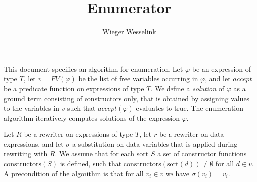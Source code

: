 \documentclass{article}
\begin{document}
\title{Enumerator}
\author{Wieger Wesselink}
\maketitle

This document specifies an algorithm for enumeration. Let $\varphi $ be an
expression of type $T$, let $v=FV(\varphi )$ be the list of free variables
occurring in $\varphi $, and let $accept$ be a predicate function on
expressions of type $T$. We define a \emph{solution} of $\varphi $ as a
ground term consisting of constructors only, that is obtained by assigning
values to the variables in $v$ such that $accept(\varphi)$ evaluates to true. The
enumeration algorithm iteratively computes solutions of the expression $%
\varphi$.

Let $R$ be a rewriter on expressions of type $T$, let $r$ be a rewriter on
data expressions, and let $\sigma $ a substitution on data variables that is
applied during rewriting with $R$. We assume that for each sort $S$ a set of
constructor functions $\mathrm{constructors}(S)$ is defined, such that $%
\mathrm{constructors}(\mathrm{sort}(d))\neq \emptyset $ for all $d\in v$. A
precondition of the algorithm is that for all $v_{i}\in v$ we have $\sigma
(v_{i})=v_{i}$.
\end{document}

